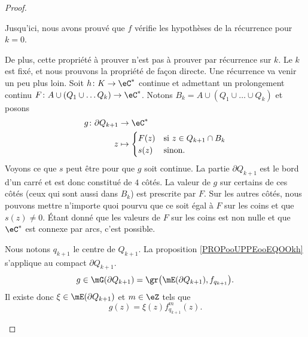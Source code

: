 \begin{proof}
\begin{subproof}

		Jusqu'ici, nous avons prouvé que \( f\) vérifie les hypothèses de la récurrence pour \( k=0\).

		De plus, cette propriété à prouver n'est pas à prouver par récurrence sur \( k\). Le \( k\) est fixé, et nous prouvons la propriété de façon directe.  Une récurrence va venir un peu plus loin.
		Soit \( h\colon K\to \eC^*\) continue et admettant un prolongement continu \( F\colon A\cup(Q_1\cup\ldots Q_k)\to \eC^*\). Notons \( B_k=A\cup(Q_1\cup\ldots\cup Q_k)\) et posons
		\begin{equation}
			\begin{aligned}
				g\colon \partial Q_{k+1} & \to \eC^*                                      \\
				z                        & \mapsto \begin{cases}
					                                   F(z) & \text{si } z\in Q_{k+1}\cap B_k \\
					                                   s(z) & \text{sinon. }
				                                   \end{cases}
			\end{aligned}
		\end{equation}
		Voyons ce que \( s\) peut être pour que \( g\) soit continue. La partie \( \partial Q_{k+1}\) est le bord d'un carré et est donc constitué de \( 4\) côtés. La valeur de \( g\) sur certains de ces côtés (ceux qui sont aussi dans \( B_k\)) est prescrite par \( F\). Sur les autres côtés, nous pouvons mettre n'importe quoi pourvu que ce soit égal à \( F\) sur les coins et que \( s(z)\neq 0\). Étant donné que les valeurs de \( F\) sur les coins est non nulle et que \( \eC^*\) est connexe par arcs, c'est possible.

		Nous notons \( q_{k+1}\) le centre de \( Q_{k+1}\). La proposition \ref{PROPooUPPEooEQOOkh} s'applique au compact \( \partial Q_{k+1}\).
		\begin{equation}
			g\in\mG(\partial Q_{k+1})=\gr\big( \mE(\partial Q_{k+1}), f_{q_{k+1}}  \big).
		\end{equation}
		Il existe donc \( \xi\in\mE(\partial Q_{k+1})\) et \( m\in \eZ\) tels que
		\begin{equation}
			g(z)=\xi(z)f_{q_{k+1}}^{m}(z).
		\end{equation}


\end{subproof}
\end{proof}
